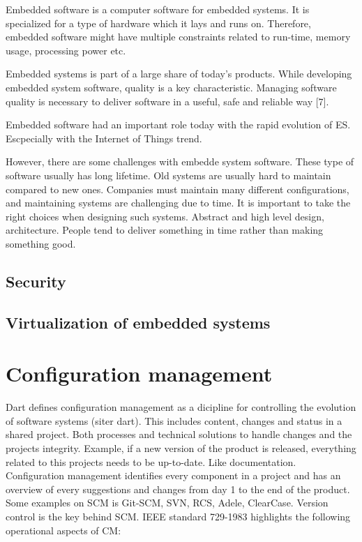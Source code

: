 Embedded software is a computer software for embedded systems. It is specialized for a type of hardware which it lays and runs on. Therefore, embedded software might have multiple constraints related to run-time, memory usage, processing power etc.

Embedded systems is part of a large share of today's products. While developing embedded system software, quality is a key characteristic. Managing software quality is necessary to deliver software in a useful, safe and reliable way [7]. 

 
Embedded software had an important role today with the rapid evolution of ES. Escpecially with the Internet of Things trend.

However, there are some challenges with embedde system software. These type of software usually has long lifetime. Old systems are usually hard to maintain compared to new ones. Companies must maintain many different configurations, and maintaining systems are challenging due to time. It is important to take the right choices when designing such systems. Abstract and high level design, architecture. People tend to deliver something in time rather than making something good. 

\subsection{Security}


\subsection{Virtualization of embedded systems}




\section{Configuration management}

Dart defines configuration management as a dicipline for controlling the evolution of software systems (siter dart). This includes content, changes and status in a shared project. Both processes and technical solutions to handle changes and the projects integrity. Example, if a new version of the product is released, everything related to this projects needs to be up-to-date. Like documentation. Configuration management identifies every component in a project and has an overview of every suggestions and changes from day 1 to the end of the product. Some examples on SCM is Git-SCM, SVN, RCS, Adele, ClearCase. Version control is the key behind SCM. IEEE standard 729-1983 highlights the following operational aspects of CM:

